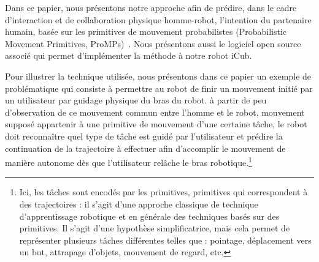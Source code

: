 \documentclass[utf8]{frontiersSCNS} %
\newcommand{\todo}[1]{\textcolor{red}{\textbf{/*#1*/}}}
\begin{document}

%
%
%
%
%
Dans ce papier, nous présentons notre approche afin de prédire, dans le cadre d'interaction et de collaboration physique homme-robot, l'intention du partenaire humain, basée sur les primitives de mouvement probabilistes (Probabilistic Movement Primitives, ProMPs)~\citep{paraschos2013probabilistic}. Nous présentons aussi le logiciel open source associé qui permet d'implémenter la méthode à notre robot iCub.



Pour illustrer la technique utilisée, nous présentons dans ce papier un exemple de problématique qui consiste à permettre au robot de finir un mouvement initié par un utilisateur par guidage physique du bras du robot.
à partir de peu d'observation de ce mouvement commun entre l'homme et le robot, mouvement supposé appartenir à une primitive de mouvement d'une certaine tâche, le robot doit reconnaître quel type de tâche est guidé par l'utilisateur et prédire la continuation de la trajectoire à effectuer afin d'accomplir le mouvement de manière autonome dès que l'utilisateur relâche le bras robotique.\footnote{Ici, les tâches sont encodés par les primitives, primitives qui correspondent à des trajectoires : il s'agit d'une approche classique de technique d'apprentissage robotique et en générale des techniques basés sur des primitives. Il s'agit d'une hypothèse simplificatrice, mais cela permet de représenter plusieurs tâches différentes telles que : pointage, déplacement vers un but, attrapage d'objets, mouvement de regard, etc.}  
\end{document}

